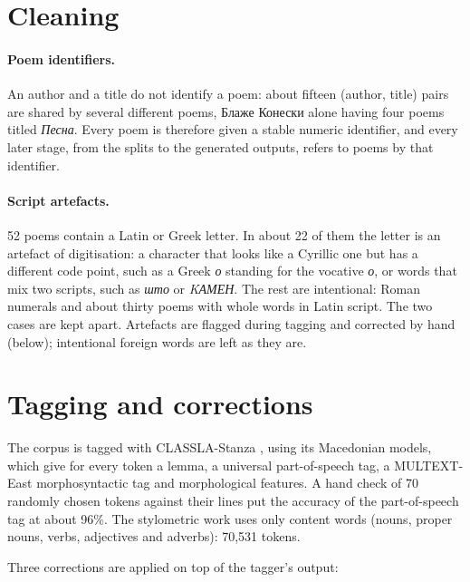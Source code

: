 \section{Cleaning}

\paragraph{Poem identifiers.} An author and a title do not identify a poem:
about fifteen (author, title) pairs are shared by several different poems,
Блаже Конески alone having four poems titled \emph{Песна}. Every poem is
therefore given a stable numeric identifier, and every later stage, from
the splits to the generated outputs, refers to poems by that identifier.

\paragraph{Script artefacts.} 52 poems contain a Latin or Greek letter. In
about 22 of them the letter is an artefact of digitisation: a character
that looks like a Cyrillic one but has a different code point, such as a
Greek \emph{о} standing for the vocative \emph{о}, or words that mix two
scripts, such as \emph{штο} or \emph{ΚАМЕН}. The rest are intentional:
Roman numerals and about thirty poems with whole words in Latin script.
The two cases are kept apart. Artefacts are flagged during tagging and
corrected by hand (below); intentional foreign words are left as they are.

\section{Tagging and corrections}

The corpus is tagged with CLASSLA-Stanza , using its Macedonian models, which give for
every token a lemma, a universal part-of-speech tag, a MULTEXT-East
morphosyntactic tag  and morphological features.
A hand check of 70 randomly chosen tokens against their lines put the
accuracy of the part-of-speech tag at about 96\%. The stylometric work uses only content
words (nouns, proper nouns, verbs, adjectives and adverbs): 70,531 tokens.

Three corrections are applied on top of the tagger's output:

